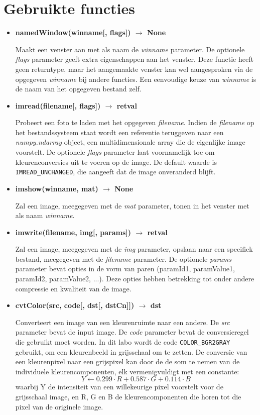 \documentclass{article}
\begin{document}
	\section{Gebruikte functies}
	\begin{itemize}
		\item \textbf{namedWindow(winname[, flags]) $\rightarrow$ None} 
		
		Maakt een venster aan met als naam de \textit{winname} parameter. De optionele \textit{flags} parameter geeft extra eigenschappen aan het venster. Deze functie heeft geen returntype, maar het aangemaakte venster kan wel aangesproken via de opgegeven \textit{winname} bij andere functies. Een eenvoudige keuze van \textit{winname} is de naam van het opgegeven bestand zelf.
		
		\item \textbf{imread(filename[, flags]) $\rightarrow$ retval}
		
		Probeert een foto te laden met het opgegeven \textit{filename}. Indien de \textit{filename} op het bestandssysteem staat wordt een referentie teruggeven naar een \textit{numpy.ndarray} object, een multidimensionale array die de eigenlijke image voorstelt. De optionele \textit{flags} parameter laat voornamelijk toe om kleurenconversies uit te voeren op de image. De default waarde is \texttt{IMREAD\_UNCHANGED}, die aangeeft dat de image onveranderd blijft.
		
		\item \textbf{imshow(winname, mat) $\rightarrow$ None}
		
		Zal een image, meegegeven met de \textit{mat} parameter, tonen in het venster met als naam \textit{winname}.
		
		
		\item \textbf{imwrite(filename, img[, params]) $\rightarrow$ retval}
		
		Zal een image, meegegeven met de \textit{img} parameter, opslaan naar een specifiek bestand, meegegeven met de \textit{filename} parameter. De optionele \textit{params} parameter bevat opties in de vorm van paren (paramId1, paramValue1, paramId2, paramValue2, ...). Deze opties hebben betrekking tot onder andere compressie en kwaliteit van de image.
		
		\item \textbf{cvtColor(src, code[, dst[, dstCn]]) $\rightarrow$ dst}
		
		Converteert een image van een kleurenruimte naar een andere. De \textit{src} parameter bevat de input image. De \textit{code} parameter bevat de conversieregel die gebruikt moet worden. In dit labo wordt de code \texttt{COLOR\_BGR2GRAY} gebruikt, om een kleurenbeeld in grijsschaal om te zetten. De conversie van een kleurenpixel naar een grijspixel kan door de de som te nemen van de individuele kleurencomponenten, elk vermenigvuldigt met een constante:
		$$Y \leftarrow 0.299 \cdot R + 0.587 \cdot G + 0.114 \cdot B$$
		waarbij Y de intensiteit van een willekeurige pixel voorstelt voor de grijsschaal image, en R, G en B de kleurencomponenten die horen tot die pixel van de originele image.
		

\end{itemize}
\end{document}
